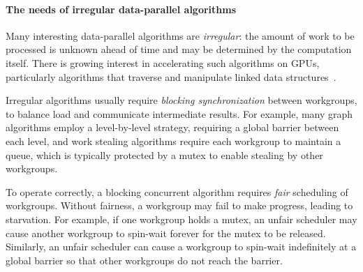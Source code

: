 \documentclass[numbers,nocopyrightspace,10pt]{sigplanconf}
\begin{document}
\paragraph{The needs of irregular data-parallel algorithms}
Many
interesting data-parallel algorithms are \emph{irregular}: the amount
of work to be processed is unknown ahead of time and may be determined
by the computation itself.  There is growing interest in accelerating such algorithms on GPUs, particularly algorithms that
traverse and manipulate linked data structures~\cite{owens-persistent,DBLP:conf/ipps/KaleemVPHP16,DBLP:conf/ipps/DavidsonBGO14,DBLP:conf/hipc/HarishN07,DBLP:journals/topc/MerrillGG15,DBLP:conf/egh/VineetHPN09,DBLP:conf/ppopp/NobariCKB12,DBLP:conf/hpcc/SolomonTT10a,DBLP:conf/popl/PrabhuRMH11,DBLP:conf/ppopp/Mendez-LojoBP12,DBLP:conf/oopsla/PaiP16,DBLP:conf/oopsla/SorensenDBGR16,DBLP:conf/egh/CedermanT08,TPO10,BNP12,Pannotia}.

Irregular algorithms usually require \emph{blocking synchronization}
between workgroups, to balance load and communicate intermediate
results.  For example, many graph algorithms employ a level-by-level strategy, requiring a global barrier between each level, and 
work stealing algorithms require each workgroup
to maintain a queue, which is typically protected by a mutex to enable
stealing by other workgroups.

To operate correctly, a blocking concurrent algorithm requires
\emph{fair} scheduling of workgroups.  Without fairness, a
workgroup may fail to make progress, leading to starvation.  For
example, if one workgroup holds a mutex, an unfair scheduler may cause
another workgroup to spin-wait forever for the mutex to be
released.  Similarly, an unfair scheduler can cause a workgroup to spin-wait
indefinitely at a global barrier so that other workgroups do not reach the barrier.

\vspace{-1mm}
\end{document}
